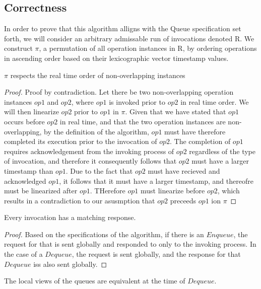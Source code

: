 \documentclass[a4paper,USenglish]{lipics-v2021} %
\begin{document}
\subsection{Correctness}
In order to prove that this algorithm alligns with the Queue specification set forth, we will consider an arbitrary admissable run of invocations denoted R. We construct $\pi$, a permutation of all operation instances in R, by ordering operations in ascending order based on their lexicographic vector timestamp values. 
\begin{lemma}
  $\pi$ respects the real time order of non-overlapping instances
\end{lemma}
\begin{proof}
  Proof by contradiction. Let there be two non-overlapping operation instances $op1$ and $op2$, where $op1$ is invoked prior to $op2$ in real time order. We will then linearize $op2$ prior to $op1$ in $\pi$. 
  Given that we have stated that $op1$ occurs before $op2$ in real time, and that the two operation instances are non-overlapping, by the definition of the algorithm, $op1$ must have therefore completed its execution prior to the invocation of $op2$. The completion of $op1$ requires acknowledgement from the invoking process of $op2$ regardless of the type of invocation, and therefore it consequently follows that $op2$ must have a larger timestamp than $op1$. Due to the fact that $op2$ must have recieved and acknowledged $op1$, it follows that it must have a larger timestamp, and thereofre must be linearized after $op1$. THerefore $op1$ must linearize before $op2$, which results in a contradiction to our asusmption that $op2$ preceeds $op1$ ion $\pi$
\end{proof}

\begin{lemma}
  Every invocation has a matching response.
\end{lemma}

\begin{proof}
Based on the specifications of the algorithm, if there is an $Enqueue$, the request for that is sent globally and responded to only to the invoking process.  In the case of a $Dequeue$, the request is sent globally, and the response for that $Dequeue$ iss also sent globally.  
\end{proof}

\begin{lemma}
  The local views of the queues are equivalent at the time of $Dequeue$.
\end{lemma}
\end{document}
